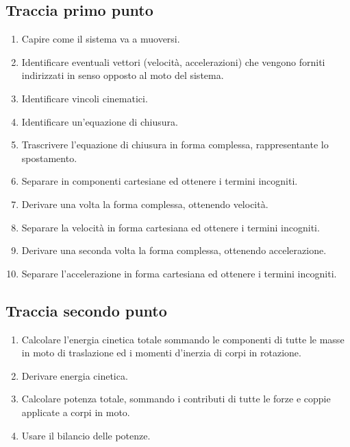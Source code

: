 \documentclass[main.tex]{subfiles}
\begin{document}
\subsection{Traccia primo punto}
\begin{enumerate}
\item Capire come il sistema va a muoversi.
\item Identificare eventuali vettori (velocità, accelerazioni) che vengono forniti indirizzati in senso opposto al moto del sistema.
\item Identificare vincoli cinematici.
\item Identificare un'equazione di chiusura.
\item Trascrivere l'equazione di chiusura in forma complessa, rappresentante lo spostamento.
\item Separare in componenti cartesiane ed ottenere i termini incogniti.
\item Derivare una volta la forma complessa, ottenendo velocità.
\item Separare la velocità in forma cartesiana ed ottenere i termini incogniti.
\item Derivare una seconda volta la forma complessa, ottenendo accelerazione.
\item Separare l'accelerazione in forma cartesiana ed ottenere i termini incogniti.
\end{enumerate}

\subsection{Traccia secondo punto}
\begin{enumerate}
\item Calcolare l'energia cinetica totale sommando le componenti di tutte le masse in moto di traslazione ed i momenti d'inerzia di corpi in rotazione.
\item Derivare energia cinetica.
\item Calcolare potenza totale, sommando i contributi di tutte le forze e coppie applicate a corpi in moto.
\item Usare il bilancio delle potenze.
\end{enumerate}
\end{document}
